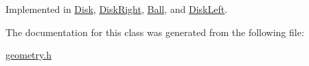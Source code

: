Implemented in \hyperlink{classDisk_a3fcfa8ff1210e7f2258dd6db44010b09}{Disk}, \hyperlink{classDiskRight_ac88e4b980a4f5ff96ffc09122b44c78a}{Disk\-Right}, \hyperlink{classBall_a3768880c8851caa9125b967c1083043c}{Ball}, and \hyperlink{classDiskLeft_a6bf1a04ca462be0549370b1e06efac6e}{Disk\-Left}.



The documentation for this class was generated from the following file\-:\begin{DoxyCompactItemize}
\item 
\hyperlink{geometry_8h}{geometry.\-h}\end{DoxyCompactItemize}
